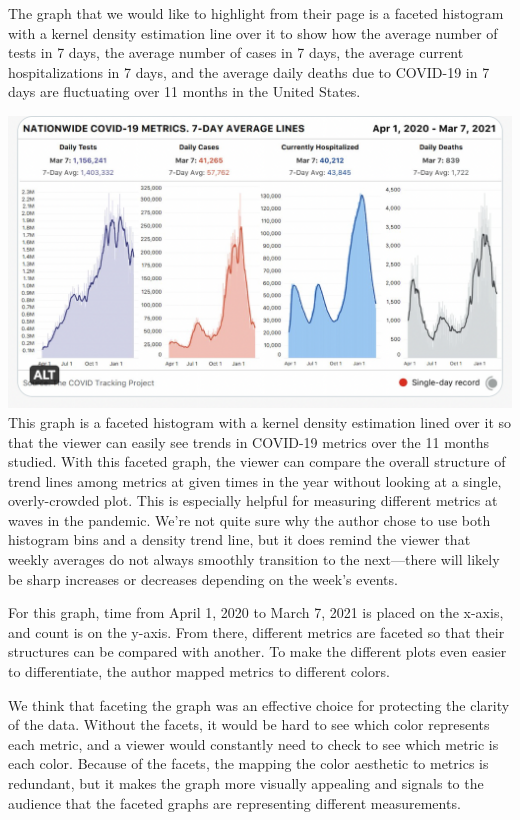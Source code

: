 \documentclass[
]{article}
\begin{document}
The graph that we would like to highlight from their page is a faceted
histogram with a kernel density estimation line over it to show how the
average number of tests in 7 days, the average number of cases in 7
days, the average current hospitalizations in 7 days, and the average
daily deaths due to COVID-19 in 7 days are fluctuating over 11 months in
the United States.

\includegraphics[width=14.58in]{original_graphs/7_day_covid_metrics}
This graph is a faceted histogram with a kernel density estimation lined
over it so that the viewer can easily see trends in COVID-19 metrics
over the 11 months studied. With this faceted graph, the viewer can
compare the overall structure of trend lines among metrics at given
times in the year without looking at a single, overly-crowded plot. This
is especially helpful for measuring different metrics at waves in the
pandemic. We're not quite sure why the author chose to use both
histogram bins and a density trend line, but it does remind the viewer
that weekly averages do not always smoothly transition to the
next---there will likely be sharp increases or decreases depending on
the week's events.

For this graph, time from April 1, 2020 to March 7, 2021 is placed on
the x-axis, and count is on the y-axis. From there, different metrics
are faceted so that their structures can be compared with another. To
make the different plots even easier to differentiate, the author mapped
metrics to different colors.

We think that faceting the graph was an effective choice for protecting
the clarity of the data. Without the facets, it would be hard to see
which color represents each metric, and a viewer would constantly need
to check to see which metric is each color. Because of the facets, the
mapping the color aesthetic to metrics is redundant, but it makes the
graph more visually appealing and signals to the audience that the
faceted graphs are representing different measurements.
\end{document}

